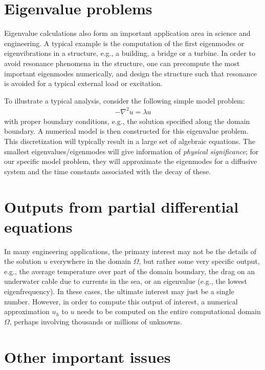 \documentclass[11pt]{article}
\begin{document}
\section{Eigenvalue problems}

Eigenvalue calculations also form an important application area
in science and engineering. A typical example is the computation
of the first eigenmodes or eigenvibrations in a structure, 
e.g., a building, a bridge or a turbine. In order to avoid 
resonance phenomena in the structure, one can precompute the 
most important eigenmodes numerically, and design the structure
such that resonance is avoided for a typical external load or 
excitation. 

To illustrate a typical analysis, consider the following 
simple model problem:
\begin{eqnarray*}
-\nabla^2 u = \lambda u 
\end{eqnarray*}
with proper boundary conditions, e.g., the solution specified 
along the domain boundary. 
A numerical model is then constructed for this eigenvalue problem. 
This discretization will typically result in a large set 
of algebraic equations. The smallest eigenvalues/eigenmodes will 
give information of {\em physical significance}; 
for our specific model problem, they will approximate the 
eigenmodes for a diffusive system and the time constants 
associated with the decay of these. 

\section{Outputs from partial differential equations}

In many engineering applications, the primary interest may not 
be the details of the solution $u$ everywhere in the
domain $\Omega$, but rather some very specific output, 
e.g., the average temperature over part of the domain boundary,
the drag on an underwater cable due to currents in the sea,
or an eigenvalue (e.g., the lowest eigenfrequency).
In these cases, the ultimate interest may just be a single number.
However, in order to compute this output of interest, 
a numerical approximation $u_h$ to $u$  needs to be 
computed on the entire computational domain  $\Omega$,
perhaps involving thousands or millions of unknowns.

\section{Other important issues}
\end{document}
